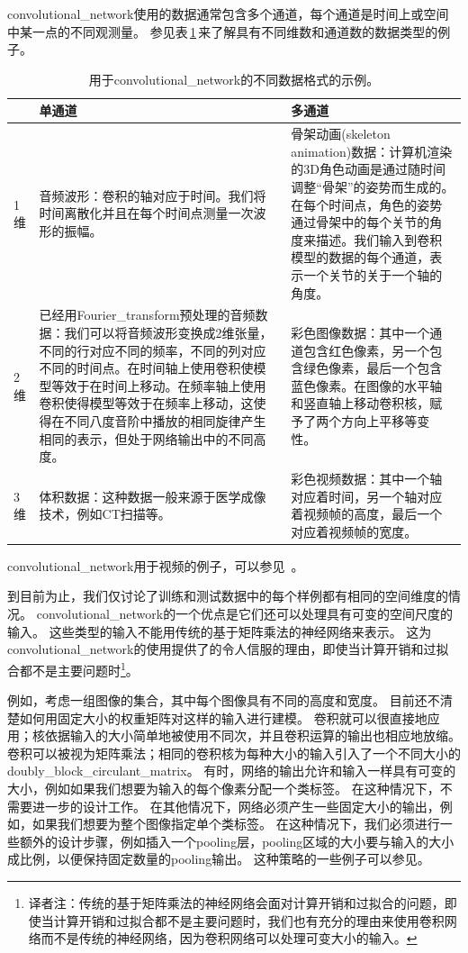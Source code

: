\gls{convolutional_network}使用的数据通常包含多个通道，每个通道是时间上或空间中某一点的不同观测量。
参见表\,\ref{table:data_types}\,来了解具有不同维数和通道数的数据类型的例子。
 
\begin{table}[htbp!]
\centering
 \begin{tabular}[t]{l|p{}|p{}}
& 单通道 & 多通道\\ \hline
1维 & 
音频波形：卷积的轴对应于时间。我们将时间离散化并且在每个时间点测量一次波形的振幅。 &  
骨架动画(skeleton animation)数据：计算机渲染的3D角色动画是通过随时间调整``骨架''的姿势而生成的。 在每个时间点，角色的姿势通过骨架中的每个关节的角度来描述。我们输入到卷积模型的数据的每个通道，表示一个关节的关于一个轴的角度。\\ \hline
2维 & 
已经用\gls{Fourier_transform}预处理的音频数据：我们可以将音频波形变换成2维张量，不同的行对应不同的频率，不同的列对应不同的时间点。在时间轴上使用卷积使模型等效于在时间上移动。在频率轴上使用卷积使得模型等效于在频率上移动，这使得在不同八度音阶中播放的相同旋律产生相同的表示，但处于网络输出中的不同高度。 & %
彩色图像数据：其中一个通道包含红色像素，另一个包含绿色像素，最后一个包含蓝色像素。在图像的水平轴和竖直轴上移动卷积核，赋予了两个方向上平移等变性。\\ \hline
3维 &
体积数据：这种数据一般来源于医学成像技术，例如CT扫描等。 & 
彩色视频数据：其中一个轴对应着时间，另一个轴对应着视频帧的高度，最后一个对应着视频帧的宽度。\\
\end{tabular}
\caption{用于\gls{convolutional_network}的不同数据格式的示例。}
\label{table:data_types}
\end{table}
 
\gls{convolutional_network}用于视频的例子，可以参见~\cite{Chen-Ting-2010}。

到目前为止，我们仅讨论了训练和测试数据中的每个样例都有相同的空间维度的情况。
\gls{convolutional_network}的一个优点是它们还可以处理具有可变的空间尺度的输入。
这些类型的输入不能用传统的基于矩阵乘法的神经网络来表示。
这为\gls{convolutional_network}的使用提供了的令人信服的理由，即使当计算开销和过拟合都不是主要问题时\footnote{译者注：传统的基于矩阵乘法的神经网络会面对计算开销和过拟合的问题，即使当计算开销和过拟合都不是主要问题时，我们也有充分的理由来使用卷积网络而不是传统的神经网络，因为卷积网络可以处理可变大小的输入。}。

例如，考虑一组图像的集合，其中每个图像具有不同的高度和宽度。
目前还不清楚如何用固定大小的权重矩阵对这样的输入进行建模。
卷积就可以很直接地应用；核依据输入的大小简单地被使用不同次，并且卷积运算的输出也相应地放缩。
卷积可以被视为矩阵乘法；相同的卷积核为每种大小的输入引入了一个不同大小的\gls{doubly_block_circulant_matrix}。
有时，网络的输出允许和输入一样具有可变的大小，例如如果我们想要为输入的每个像素分配一个类标签。
在这种情况下，不需要进一步的设计工作。
在其他情况下，网络必须产生一些固定大小的输出，例如，如果我们想要为整个图像指定单个类标签。
在这种情况下，我们必须进行一些额外的设计步骤，例如插入一个\gls{pooling}层，\gls{pooling}区域的大小要与输入的大小成比例，以便保持固定数量的\gls{pooling}输出。
这种策略的一些例子可以参见。

